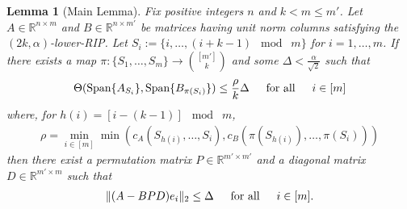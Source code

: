 \documentclass[journal,onecolumn]{IEEEtran}
\newtheorem{lemma}{Lemma}
\begin{document}

\begin{lemma}[Main Lemma]\label{MainLemma}
Fix positive integers $n$ and $k < m \leq m'$. Let $A \in \mathbb{R}^{n \times m}$ and $B \in \mathbb{R}^{n \times m'}$ be matrices having unit norm columns satisfying the $(2k,\alpha)$-lower-RIP. Let $S_i := \{i, \ldots, (i + k-1)\;\bmod\; m \}$ for $i = 1, \ldots, m$. If there exists a map $\pi: \{S_1, \ldots, S_m\} \to {[m'] \choose k}$ and some $\Delta < \frac{\alpha}{\sqrt{2}}$ such that 
\begin{equation}\label{GapUpperBound}
\Theta(\text{Span}\{A_{S_i}\}, \text{Span}\{B_{\pi(S_i)}\}) \leq \frac{ \rho }{k} \Delta \indent \text{for all} \indent i \in [m]
\end{equation}
%
where, for $h(i) = \left[ i - (k-1) \right] \;\bmod\; m$,
\begin{align}\label{rhodef}
\rho = \min_{ i \in [m] } \min \left( c_A(S_{h(i)}, \ldots, S_i), c_B(\pi(S_{h(i)}), \ldots, \pi(S_i)) \right)
\end{align}
then there exist a permutation matrix $P \in \mathbb{R}^{m' \times m'}$ and a diagonal matrix $D \in \mathbb{R}^{m' \times m}$ such that
\begin{align}
\|(A - BPD)e_i\|_2 \leq \Delta \indent \text{for all} \indent i \in [m].
\end{align}
\end{lemma}
\end{document}
